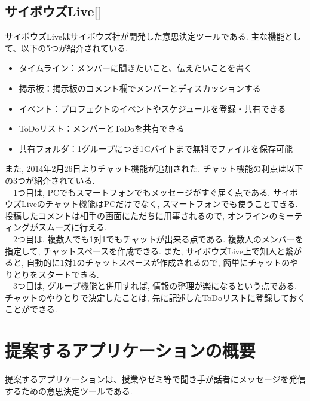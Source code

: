 \documentclass{funthesis}
\begin{document}
\section{サイボウズLive[] }



サイボウズLiveはサイボウズ社が開発した意思決定ツールである. 
主な機能として、以下の5つが紹介されている.
\begin{itemize}
 \item タイムライン：メンバーに聞きたいこと、伝えたいことを書く
 \item 掲示板：掲示板のコメント欄でメンバーとディスカッションする
 \item イベント：プロフェクトのイベントやスケジュールを登録・共有できる
 \item ToDoリスト：メンバーとToDoを共有できる
 \item 共有フォルダ：1グループにつき1Gバイトまで無料でファイルを保存可能
\end{itemize}
また, 2014年2月26日よりチャット機能が追加された. チャット機能の利点は以下の3つが紹介されている.\\
　1つ目は, PCでもスマートフォンでもメッセージがすぐ届く点である. サイボウズLiveのチャット機能はPCだけでなく, スマートフォンでも使うことできる. 投稿したコメントは相手の画面にただちに用事されるので, オンラインのミーティングがスムーズに行える. \\
　2つ目は,  複数人でも1対1でもチャットが出来る点である. 複数人のメンバーを指定して, チャットスペースを作成できる. また, サイボウズLive上で知人と繋がると, 自動的に1対1のチャットスペースが作成されるので, 簡単にチャットのやりとりをスタートできる. \\
　3つ目は,  グループ機能と併用すれば, 情報の整理が楽になるという点である. チャットのやりとりで決定したことは, 先に記述したToDoリストに登録しておくことができる. \\

\chapter{提案するアプリケーションの概要}

提案するアプリケーションは、授業やゼミ等で聞き手が話者にメッセージを発信するための意思決定ツールである. 
\end{document}
